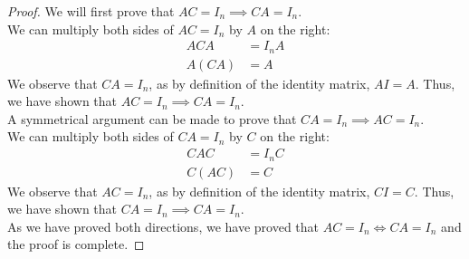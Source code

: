 \documentclass[11pt]{scrartcl}
\theoremstyle{dotlessP}
\theoremstyle{dotlessN}
\begin{document}
\begin{proof}
	We will first prove that $AC = I_n \implies CA = I_n$.
	\\

	We can multiply both sides of $AC = I_n$ by $A$ on the right:
	\begin{align*}
		ACA &= I_n A \\
		A(CA) &= A
	\end{align*}
	We observe that $CA = I_n$, as by definition of the identity matrix, $AI = A$. Thus, we have shown that $AC = I_n \implies CA = I_n$.
	\\

	A symmetrical argument can be made to prove that $CA = I_n \implies AC = I_n$.
	\\

	We can multiply both sides of $CA = I_n$ by $C$ on the right:
	\begin{align*}
		CAC &= I_n C \\
		C(AC) &= C
	\end{align*}
	We observe that $AC = I_n$, as by definition of the identity matrix, $CI = C$. Thus, we have shown that $CA = I_n \implies CA = I_n$.
% 
% 
	\\

	As we have proved both directions, we have proved that $AC = I_n \iff CA = I_n$ and the proof is complete.
\end{proof}
\end{document}

